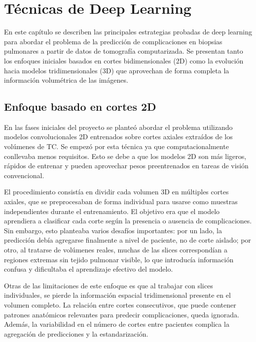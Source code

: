 
\chapter{Técnicas de Deep Learning} \label{chap:dl-info}

En este capítulo se describen las principales estrategias probadas de deep learning para abordar el problema de la predicción de complicaciones en biopsias pulmonares a partir de datos de tomografía computarizada. Se presentan tanto los enfoques iniciales basados en cortes bidimensionales (2D) como la evolución hacia modelos tridimensionales (3D) que aprovechan de forma completa la información volumétrica de las imágenes.  

\section{Enfoque basado en cortes 2D}

En las fases iniciales del proyecto se planteó abordar el problema utilizando modelos convolucionales 2D entrenados sobre cortes axiales extraídos de los volúmenes de TC. Se empezó por esta técnica ya que computacionalmente conllevaba menos requisitos. Esto se debe a que los modelos 2D son más ligeros, rápidos de entrenar y pueden aprovechar pesos preentrenados en tareas de visión convencional.

El procedimiento consistía en dividir cada volumen 3D en múltiples cortes axiales, que se preprocesaban de forma individual para usarse como muestras independientes durante el entrenamiento. El objetivo era que el modelo aprendiera a clasificar cada corte según la presencia o ausencia de complicaciones. Sin embargo, esto planteaba varios desafíos importantes: por un lado, la predicción debía agregarse finalmente a nivel de paciente, no de corte aislado; por otro, al tratarse de volúmenes reales, muchas de las slices correspondían a regiones extremas sin tejido pulmonar visible, lo que introducía información confusa y dificultaba el aprendizaje efectivo del modelo.

Otras de las limitaciones de este enfoque es que al trabajar con slices individuales, se pierde la información espacial tridimensional presente en el volumen completo. La relación entre cortes consecutivos, que puede contener patrones anatómicos relevantes para predecir complicaciones, queda ignorada. Además, la variabilidad en el número de cortes entre pacientes complica la agregación de predicciones y la estandarización.

